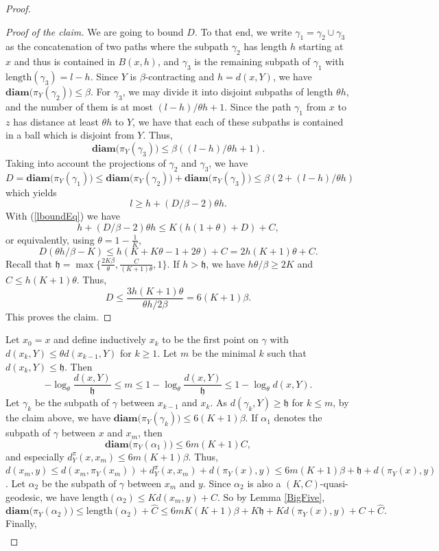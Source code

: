 \documentclass[10pt,a4paper]{amsart}
\newcommand{\diam }[1]{{\textbf{diam}\big(#1\big)}}
\begin{document}
\begin{proof}
\begin{proof}[Proof of the claim]
		We are going to bound $D$. To that end,  we write $\gamma_1 = \gamma_2 \cup \gamma_3$ as the concatenation of two paths where  the subpath $\gamma_2$ has length $h$ starting at $x$ and thus is contained in $B(x, h)$, and $\gamma_3$ is the remaining subpath of $\gamma_1$ with $\mathrm{length}(\gamma_3) = l - h$. Since $Y$ is $\beta$-contracting and $h = d(x, Y)$, we have $\diam{\pi_Y(\gamma_2)} \le \beta$. For $\gamma_3$, we may divide it into disjoint subpaths of length $\theta h$, and the number of them is at most $({l-h})/{\theta h} + 1.$ Since the path $\gamma_1$ from $x$ to $z$ has distance at least $\theta h$ to $Y$, we have that each of these subpaths is contained in a ball which is disjoint from $Y$. Thus, $$\diam{\pi_Y(\gamma_3)}\le \beta\left({(l-h)}/{\theta h} + 1\right).$$ Taking into account the projections  of $\gamma_2$ and $\gamma_3$, we have $$D = \diam{\pi_Y(\gamma_1)} \le \diam{\pi_Y(\gamma_2)} + \diam{\pi_Y(\gamma_3)} \le \beta \left(2 + {(l-h)}/{\theta h}\right)$$
		which yields $$l \ge h + \left({D}/{\beta} - 2\right)\theta h.$$
		With (\ref{lboundEq}) we have $$h + \left({D}/{\beta} - 2\right) \theta h \le K\left(h(1+\theta) + D\right) + C,$$ or equivalently, using  $\theta=1-\frac{1}{K}$, $$D\left( {\theta h}/{\beta} - K\right)  \le h\left(K +K\theta- 1+2\theta \right) + C =  2h(K +1 )\theta + C.$$ Recall that   $\mathfrak h= \max\{\frac{2K\beta}{\theta}, \frac{C}{(K+1)\theta}, 1\}$. If $h > \mathfrak h$, we have ${h\theta }/{\beta} \ge 2K$ and $C\le h (K +1) \theta$. Thus, $$D \le \frac{3h(K +1)\theta}{{\theta h}/{2\beta}} = 6(K + 1)\beta.$$
		This proves the claim.
	\end{proof}
	Let $x_0 = x$ and define inductively $x_k$ to be the first point on $\gamma$ with $d(x_k, Y) \le \theta d(x_{k-1}, Y)$ for $k\ge 1$. Let $m$ be the minimal $k$ such that $d(x_k, Y)\le \mathfrak h$. Then $$-{\log_{\theta} \frac{d(x,Y)}{\mathfrak h}} \le m \le 1- {\log_\theta \frac{d(x,Y)}{\mathfrak h}} \le 1 - \log_\theta d(x,Y).$$  
	Let $\gamma_k$ be the subpath of $\gamma$ between $x_{k-1}$ and $x_k$. As    $d(\gamma_{k}, Y)\ge \mathfrak h$ for $k\le m$, by the claim above, we have $\diam{\pi_Y(\gamma_k)}\le 6(K+1) \beta$. If $\alpha_1$ denotes the subpath of $\gamma$ between $x$ and $x_m$, then $$\diam{\pi_Y(\alpha_1)} \le 6m(K+1) C,$$ and especially $d_Y^\pi(x, x_m) \le 6m(K+1) \beta$. Thus, $d(x_m, y)\le d(x_m, \pi_Y(x_m)) + d_Y^\pi(x, x_m) + d(\pi_Y(x), y) \le 6m(K+1)\beta + \mathfrak h + d(\pi_Y(x), y)$. Let $\alpha_2$ be the subpath of $\gamma$ between $x_m$ and $y$. Since $\alpha_2$ is also a $(K, C)$-quasi-geodesic, we have $\mathrm{length}(\alpha_2)\le K d(x_m, y) + C$. So by Lemma \ref{BigFive}, $$\diam{\pi_Y(\alpha_2)} \le \mathrm{length}(\alpha_2) + \hat C \le 6m K(K+1) \beta + K \mathfrak h + K d(\pi_Y(x), y) + C + \hat C.$$ Finally, $$\begin{aligned}

\end{aligned}$$
\end{proof}
\end{document}
